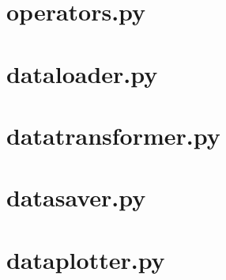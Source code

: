 \section{operators.py}

\section{dataloader.py}

\section{datatransformer.py}

\section{datasaver.py}

\section{dataplotter.py}


% 

 
